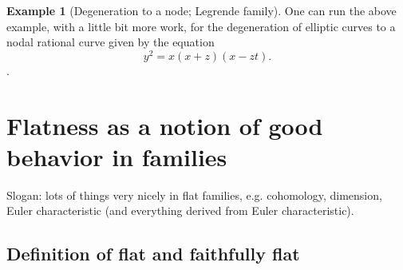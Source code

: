 \documentclass[10pt]{article}
\theoremstyle{definition}
\newtheorem{exmp}[thm]{Example}
\newcommand{\PP}{\mathbb{P}}
\newcommand{\todo}[1]{\textbf{\textcolor{red}{TODO #1}}}
\begin{document}
\begin{exmp}[Degeneration to a node; Legrende family]
One can run the above example, with a little bit more work, for the degeneration of elliptic curves to a nodal rational curve given by the equation
$$y^2 = x(x+z)(x-zt).$$.  

\end{exmp}

\newpage



\newpage





\section{Flatness as a notion of good behavior in families}

Slogan: lots of things very nicely in flat families, e.g. cohomology, dimension, Euler characteristic (and everything derived from Euler characteristic).


\subsection{Definition of flat and faithfully flat}
\end{document}
